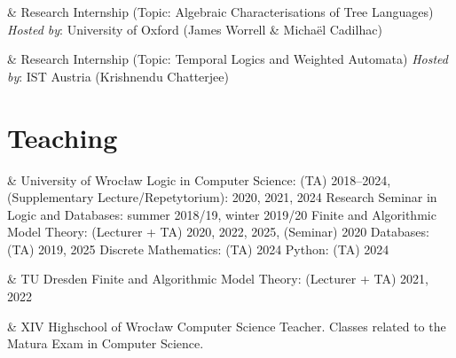 \documentclass[10pt,a4paper]{article}
\begin{document}
\begin{EntriesTableYear}
    & 
  Research Internship (Topic: Algebraic Characterisations of Tree Languages)\newline
  \emph{Hosted by}: University of Oxford (James Worrell \& Michaël Cadilhac)
\end{EntriesTableYear}

\begin{EntriesTableYear}
    & 
  Research Internship (Topic: Temporal Logics and Weighted Automata)\newline
  \emph{Hosted by}: IST Austria (Krishnendu Chatterjee)
\end{EntriesTableYear}


\section{Teaching}

\begin{EntriesTableYear}
   & University of Wrocław\newline
  Logic in Computer Science: (TA) 2018--2024, (Supplementary Lecture/Repetytorium): 2020, 2021, 2024\newline
  Research Seminar in Logic and Databases: summer 2018/19, winter 2019/20\newline
  Finite and Algorithmic Model Theory: (Lecturer + TA) 2020, 2022, 2025, (Seminar) 2020 \newline
  Databases: (TA) 2019, 2025\newline
  Discrete Mathematics: (TA) 2024\newline
  Python: (TA) 2024
\end{EntriesTableYear}

\begin{EntriesTableYear}
   & TU Dresden\newline
  Finite and Algorithmic Model Theory: (Lecturer + TA) 2021, 2022
\end{EntriesTableYear}

\begin{EntriesTableYear}
   &  XIV Highschool of Wrocław\newline
  Computer Science Teacher. Classes related to the Matura Exam in Computer Science.
\end{EntriesTableYear}
\end{document}
